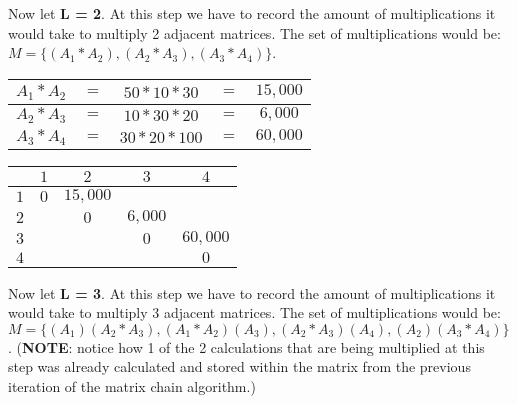 \documentclass{article}
\begin{document}
Now let \textbf{L = 2}. At this step we have to record the amount of multiplications it would take to multiply 2 adjacent matrices. The set of multiplications would be: $M = \{(A_{1} * A_{2}), (A_{2} * A_{3}), (A_{3} * A_{4})\}$. 

\begin{center}
	\begin{tabular}{| c c c c c |}
		\hline
		$A_{1} * A_{2}$ &$=$ &$50 * 10 * 30$ &$=$ &$15,000$\\
		\hline		
		$A_{2} * A_{3}$ &$=$ &$10 * 30 * 20$ &$=$ &$6,000$ \\
		\hline
		$A_{3} * A_{4}$ &$=$ &$30 * 20 * 100$ &$=$ &$60,000$\\ 
		\hline	
	
	\end{tabular}
\end{center}
\begin{center}

	\begin{tabular}{c | c | c | c | c}
	
		&$1$ &$2$ &$3$ &$4$ \\
		\hline
		$1$ &$0$ &$15,000$ & &\\
		\hline
		$2$ & &$0$ &$6,000$ &\\
		\hline
		$3$ & & &$0$ &$60,000$\\
		\hline
		$4$ & & & &$0$\\
		
	\end{tabular}
\end{center}

Now let \textbf{L = 3}. At this step we have to record the amount of multiplications it would take to multiply 3 adjacent matrices. The set of multiplications would be: $M = \{(A_{1})(A_{2} * A_{3}), (A_{1} *A_{2})(A_{3}), (A_{2} * A_{3})(A_{4}), (A_{2})(A_{3} * A_{4})\}$. (\textbf{NOTE}: notice how 1 of the 2 calculations that are being multiplied at this step was already calculated and stored within the matrix from the previous iteration of the matrix chain algorithm.)
\end{document}
